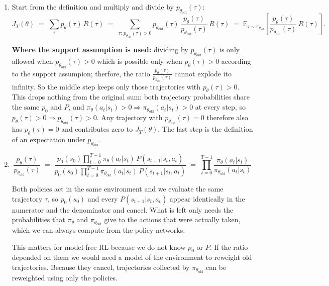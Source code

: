\documentclass[11pt]{article}
\newcommand{\piold}{\pi_{\theta_{\mathrm{old}}}}
\newcommand{\E}{\mathbb{E}}
\begin{document}
\begin{enumerate}[label=(\alph*)]
  \item Start from the definition and multiply and divide by $p_{\theta_{\text{old}}}(\tau)$:
        \[
          J_T(\theta) \;=\; \sum_\tau p_\theta(\tau)\, R(\tau)
          \;=\; \sum_{\tau:\, p_{\theta_{\text{old}}}(\tau) > 0} p_{\theta_{\text{old}}}(\tau)\,
          \frac{p_\theta(\tau)}{p_{\theta_{\text{old}}}(\tau)}\, R(\tau)
          \;=\; \E_{\tau \sim \piold}\!\left[\frac{p_\theta(\tau)}{p_{\theta_{\text{old}}}(\tau)}\, R(\tau)\right].
        \]

        \textbf{Where the support assumption is used:} dividing by $p_{\theta_{\text{old}}}(\tau)$
        is only allowed when $p_{\theta_{\text{old}}}(\tau) > 0$ which is possible only when
        $p_{\theta}(\tau) > 0$ according to the support assumpion; therfore, the ratio $\frac{p_{\theta}(\tau)}{p_{\theta_{\text{old}}}(\tau)}$ cannot explode ito infinity. So the middle step keeps only those trajectories with  $p_{\theta}(\tau) > 0$. This drops nothing from the original sum: both trajectory probabilities share the same
        $p_0$ and $P$, and $\pi_\theta(a_t|s_t) > 0 \Rightarrow \piold(a_t|s_t) > 0$ at every step, so
        $p_\theta(\tau) > 0 \Rightarrow p_{\theta_{\text{old}}}(\tau) > 0$. Any trajectory with
        $p_{\theta_{\text{old}}}(\tau) = 0$ therefore also has $p_\theta(\tau) = 0$ and contributes zero to
        $J_T(\theta)$. The last step is the definition of an expectation under $p_{\theta_{\text{old}}}$.

  \item
        \[
          \frac{p_\theta(\tau)}{p_{\theta_{\text{old}}}(\tau)}
          \;=\;
          \frac{p_0(s_0)\displaystyle\prod_{t=0}^{T-1}\pi_\theta(a_t|s_t)\,P(s_{t+1}|s_t,a_t)}
          {p_0(s_0)\displaystyle\prod_{t=0}^{T-1}\piold(a_t|s_t)\,P(s_{t+1}|s_t,a_t)}
          \;=\;
          \prod_{t=0}^{T-1}\frac{\pi_\theta(a_t|s_t)}{\piold(a_t|s_t)}
        \]

        Both policies act in the same environment and we evaluate the same trajectory $\tau$, so
        $p_0(s_0)$ and every $P(s_{t+1}|s_t,a_t)$ appear identically in the numerator and the
        denominator and cancel. What is left only needs the probabilities that $\pi_\theta$ and $\piold$
        give to the actions that were actually taken, which we can always compute from the policy networks.

        This matters for model-free RL because we do not know $p_0$ or $P$. If the ratio depended on
        them we would need a model of the environment to reweight old trajectories. Because they cancel,
        trajectories collected by $\piold$ can be reweighted using only the policies.


\end{enumerate}
\end{document}
